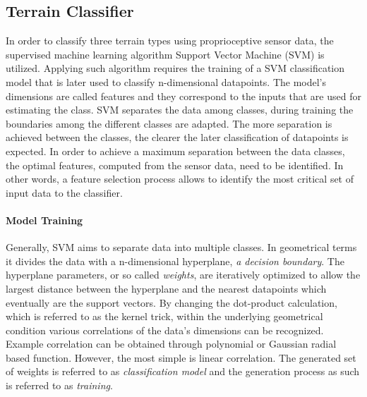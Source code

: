 \subsection{Terrain Classifier}

In order to classify three terrain types using proprioceptive sensor data, the supervised machine learning algorithm Support Vector Machine (SVM) \cite{cortes1995} is utilized. 
Applying such algorithm requires the training of a SVM classification model that is later used to classify n-dimensional datapoints.
The model's dimensions are called features and they correspond to the inputs that are used for estimating the class. 
SVM separates the data among classes, during training the boundaries among the different classes are adapted. 
The more separation is achieved between the classes, the clearer the later classification of datapoints is expected. 
In order to achieve a maximum separation between the data classes, the optimal features, computed from the sensor data, need to be identified. 
In other words, a feature selection process allows to identify the most critical set of input data to the classifier. 

\paragraph*{Model Training}
Generally, SVM aims to separate data into multiple classes. 
In geometrical terms it divides the data with a n-dimensional hyperplane, \emph{a decision boundary}. 
The hyperplane parameters, or so called \emph{weights}, are iteratively optimized to allow the largest distance between the hyperplane and the nearest datapoints which eventually are the support vectors.  
By changing the dot-product calculation, which is referred to as the kernel trick, within the underlying geometrical condition various correlations of the data's dimensions can be recognized. 
Example correlation can be obtained through polynomial or Gaussian radial based function.
However, the most simple is linear correlation.
The generated set of weights is referred to as \emph{classification model} and the generation process as such is referred to as \emph{training}.%



